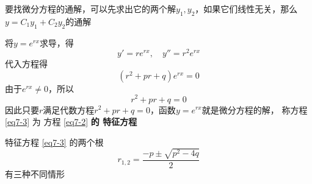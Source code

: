 \documentclass[11pt]{article}
\begin{document}
要找微分方程的通解，可以先求出它的两个解\(y_1,y_2\)，如果它们线性无关，那么
\(y=C_1y_1+C_2y_2\)的通解

将\(y=e^{rx}\)求导，得
\begin{equation*}
y'=re^{rx},\quad y''=r^2e^{rx}
\end{equation*}
代入方程得
\begin{equation*}
(r^2+pr+q)e^{rx}=0
\end{equation*}
由于\(e^{rx}\neq0\)，所以
\begin{equation}
r^2+pr+q=0\label{eq7-3}
\end{equation}
因此只要\(r\)满足代数方程\(r^2+pr+q=0\)，函数\(y=e^{rx}\)就是微分方程的解，
称方程 \eqref{eq7-3}
为 方程 \eqref{eq7-2} \textbf{的 特征方程}

特征方程 \eqref{eq7-3} 的两个根
\begin{equation*}
r_{1,2}=\frac{-p\pm\sqrt{p^2-4q}}{2}
\end{equation*}
有三种不同情形
\end{document}
